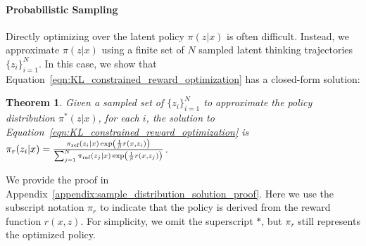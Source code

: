 \documentclass{article} %
\newtheorem{theorem}{Theorem}
\begin{document}
\paragraph*{Probabilistic Sampling}Directly optimizing over the latent policy $\pi(z|x)$ is often difficult. Instead, we approximate $\pi(z|x)$ using a finite set of  $N$ sampled latent thinking trajectories $\{z_i\}^{N}_{i=1}$. In this case, we show that Equation~\ref{eqn:KL_constrained_reward_optimization} has a closed-form solution:
\begin{theorem}\label{thm:sample_distribution_solution}
    Given a sampled set of $\{z_i\}^{N}_{i=1}$ to approximate the policy distribution $\pi^{*}(z|x)$, for each $i$, the solution to Equation~\ref{eqn:KL_constrained_reward_optimization} is 
    $\pi_{r}(z_i|x)=\frac{\pi_\text{ref}(z_i\mid x)\exp\left(\frac{1}{\beta}r(x, z_i)\right)}{\sum^{N}_{j=1}\pi_\text{ref}(z_j\mid x)\exp\left(\frac{1}{\beta}r(x, z_j)\right)}$.
\end{theorem}
We provide the proof in Appendix~\ref{appendix:sample_distribution_solution_proof}. Here we use the subscript notation $\pi_{r}$ to indicate that the policy is derived from the reward function $r(x, z)$. For simplicity, we omit the superscript $*$, but $\pi_{r}$ still represents the optimized policy.
\end{document}
